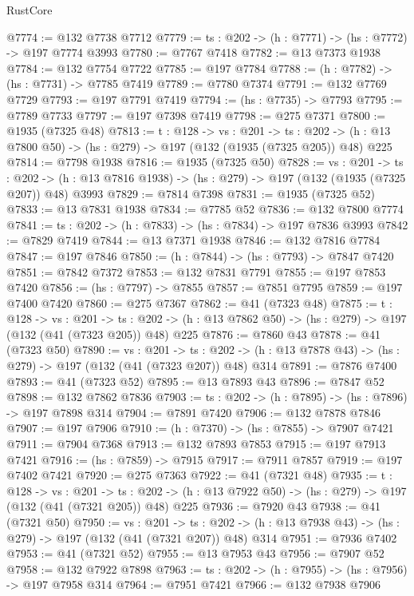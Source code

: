 \begin{lexlean}{RustCore}
\begin{coremodule}
@7774 := @132 @7738 @7712
@7779 := {ts : @202} -> (h : @7771) -> (hs : @7772) -> @197 @7774 @3993
@7780 := @7767 @7418
@7782 := @13 @7373 @1938
@7784 := @132 @7754 @7722
@7785 := @197 @7784
@7788 := (h : @7782) -> (hs : @7731) -> @7785 @7419
@7789 := @7780 @7374
@7791 := @132 @7769 @7729
@7793 := @197 @7791 @7419
@7794 := (hs : @7735) -> @7793
@7795 := @7789 @7733
@7797 := @197 @7398 @7419
@7798 := @275 @7371
@7800 := @1935 (@7325 @48)
@7813 := {t : @128} ->
  {vs : @201} ->
  {ts : @202} -> (h : @13 @7800 @50) -> (hs : @279) -> @197 (@132 (@1935 (@7325 @205)) @48) @225
@7814 := @7798 @1938
@7816 := @1935 (@7325 @50)
@7828 := {vs : @201} ->
  {ts : @202} -> (h : @13 @7816 @1938) -> (hs : @279) -> @197 (@132 (@1935 (@7325 @207)) @48) @3993
@7829 := @7814 @7398
@7831 := @1935 (@7325 @52)
@7833 := @13 @7831 @1938
@7834 := @7785 @52
@7836 := @132 @7800 @7774
@7841 := {ts : @202} -> (h : @7833) -> (hs : @7834) -> @197 @7836 @3993
@7842 := @7829 @7419
@7844 := @13 @7371 @1938
@7846 := @132 @7816 @7784
@7847 := @197 @7846
@7850 := (h : @7844) -> (hs : @7793) -> @7847 @7420
@7851 := @7842 @7372
@7853 := @132 @7831 @7791
@7855 := @197 @7853 @7420
@7856 := (hs : @7797) -> @7855
@7857 := @7851 @7795
@7859 := @197 @7400 @7420
@7860 := @275 @7367
@7862 := @41 (@7323 @48)
@7875 := {t : @128} ->
  {vs : @201} ->
  {ts : @202} -> (h : @13 @7862 @50) -> (hs : @279) -> @197 (@132 (@41 (@7323 @205)) @48) @225
@7876 := @7860 @43
@7878 := @41 (@7323 @50)
@7890 := {vs : @201} ->
  {ts : @202} -> (h : @13 @7878 @43) -> (hs : @279) -> @197 (@132 (@41 (@7323 @207)) @48) @314
@7891 := @7876 @7400
@7893 := @41 (@7323 @52)
@7895 := @13 @7893 @43
@7896 := @7847 @52
@7898 := @132 @7862 @7836
@7903 := {ts : @202} -> (h : @7895) -> (hs : @7896) -> @197 @7898 @314
@7904 := @7891 @7420
@7906 := @132 @7878 @7846
@7907 := @197 @7906
@7910 := (h : @7370) -> (hs : @7855) -> @7907 @7421
@7911 := @7904 @7368
@7913 := @132 @7893 @7853
@7915 := @197 @7913 @7421
@7916 := (hs : @7859) -> @7915
@7917 := @7911 @7857
@7919 := @197 @7402 @7421
@7920 := @275 @7363
@7922 := @41 (@7321 @48)
@7935 := {t : @128} ->
  {vs : @201} ->
  {ts : @202} -> (h : @13 @7922 @50) -> (hs : @279) -> @197 (@132 (@41 (@7321 @205)) @48) @225
@7936 := @7920 @43
@7938 := @41 (@7321 @50)
@7950 := {vs : @201} ->
  {ts : @202} -> (h : @13 @7938 @43) -> (hs : @279) -> @197 (@132 (@41 (@7321 @207)) @48) @314
@7951 := @7936 @7402
@7953 := @41 (@7321 @52)
@7955 := @13 @7953 @43
@7956 := @7907 @52
@7958 := @132 @7922 @7898
@7963 := {ts : @202} -> (h : @7955) -> (hs : @7956) -> @197 @7958 @314
@7964 := @7951 @7421
@7966 := @132 @7938 @7906

\end{coremodule}
\end{lexlean}
